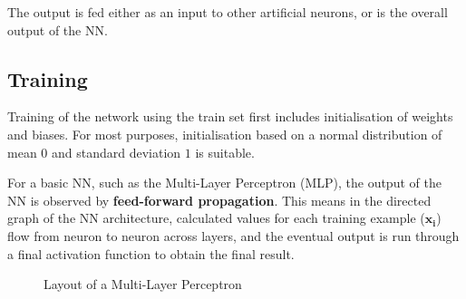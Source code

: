 \documentclass[12pt,a4paper,twoside,openright]{report}
\renewcommand{\vec}[1]{\mathbf{#1}}
\begin{document}
The output is fed either as an input to other artificial neurons, or is the overall
output of the NN.

\subsection{Training}
\label{sec:introTraining}

Training of the network using the train set first includes initialisation of 
weights and biases. For most purposes, initialisation based on a normal distribution
of mean $0$ and standard deviation $1$ is suitable. 

For a basic NN, such as the Multi-Layer Perceptron (MLP), the output of the NN is
observed by \textbf{feed-forward propagation}. This means in the directed graph
of the NN architecture, calculated values for each training example ($\vec{x_i}$)
flow from neuron to neuron across layers, and the eventual
output is run through a final activation function to obtain the final result.

\begin{figure}[H]
\centering
{}
\caption[Layout of an MLP]{Layout of a Multi-Layer Perceptron\footnotemark}
\label{fig:MLP}
\end{figure}
\end{document}
